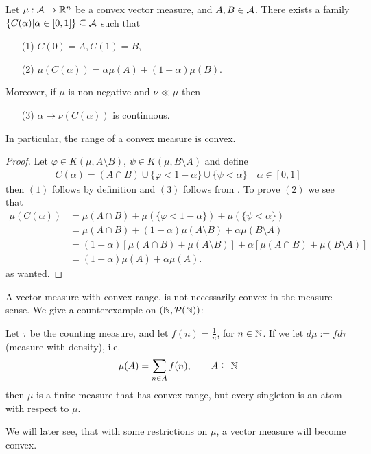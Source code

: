 \begin{theorem}\label{thm: why called convex}
Let $\mu: \mathcal{A} \to \mathbb{R}^{n}$ be a convex vector measure, and $A, B \in \mathcal{A}$. There exists a family $\{ C(\alpha) | \alpha \in [0,1] \} \subseteq \mathcal{A}$ such that
\begin{itemize}
\item[(1)] $C(0)=A, C(1)=B$,
\item[(2)] $\mu(C(\alpha)) = \alpha\mu(A) + (1-\alpha) \mu(B)$.
\end{itemize}
Moreover, if $\mu$ is non-negative and $\nu \ll \mu$ then
\begin{itemize}
\item[(3)] $\alpha \mapsto \nu(C(\alpha))$ is continuous.
\end{itemize}
In particular, the range of a convex measure is convex.
\end{theorem}
\begin{proof}
Let $\varphi \in K(\mu, A \setminus B)$, $\psi \in K(\mu, B\setminus A)$ and define
\begin{align*}
	C(\alpha) = (A \cap B) \cup \{\varphi < 1-\alpha\} \cup \{\psi < \alpha\}  \quad \alpha \in [0,1]
\end{align*}
then $(1)$ follows by definition and $(3)$ follows from . To prove $(2)$ we see that
\begin{align*}
	\mu(C(\alpha))&=\mu(A\cap B) + \mu(\{\varphi<1-\alpha\}) + \mu(\{\psi<\alpha\}) \\
	&=\mu(A\cap B) + (1-\alpha)\mu(A\setminus B) + \alpha\mu(B\setminus A) \\
	&=(1-\alpha)[\mu(A\cap B) + \mu(A\setminus B)] + \alpha[\mu(A\cap B)+\mu(B\setminus A)] \\
	&=(1-\alpha)\mu(A)+\alpha\mu(A).
\end{align*}
as wanted.
\end{proof}

\begin{example}\label{convex range but not convex}
A vector measure with convex range, is not necessarily convex in the measure sense. We give a counterexample on $(\mathbb{N}, \mathcal{P}(\mathbb{N}))$: 

Let $\tau$ be the counting measure, and let $f(n)=\frac{1}{n}$, for $n\in \mathbb{N}$. If we let $d\mu:=fd\tau$ (measure with density), i.e.
\begin{align*}
	\mu(A)=\sum_{n\in A}f(n), \qquad A\subseteq \mathbb{N}
\end{align*}
then $\mu$ is a finite measure that has convex range, but every singleton is an atom with respect to $\mu$.

We will later see, that with some restrictions on $\mu$, a vector measure will become convex.
\end{example}


